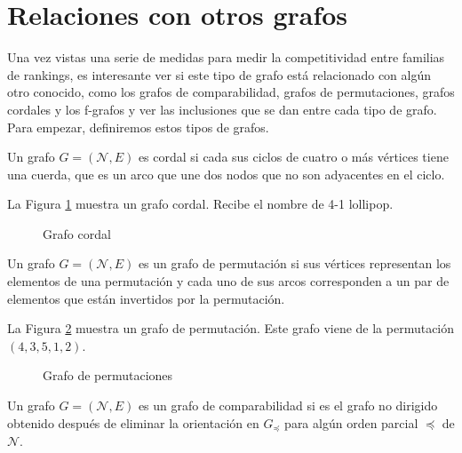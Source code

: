 \section{Relaciones con otros grafos}

Una vez vistas una serie de medidas para medir la competitividad entre familias de rankings, es interesante ver si este tipo de grafo está relacionado con algún otro conocido, como los grafos de comparabilidad, grafos de permutaciones, grafos cordales y los f-grafos y ver las inclusiones que se dan entre cada tipo de grafo. Para empezar, definiremos estos tipos de grafos.

\begin{defi}
Un grafo $G = (\mathcal{N}, E)$ es cordal si cada sus ciclos de cuatro o más vértices tiene una cuerda, que es un arco que une dos nodos que no son adyacentes en el ciclo.
\end{defi} 

\begin{ejemplo}
La Figura \ref{fig:grafo_cordal} muestra un grafo cordal. Recibe el nombre de 4-1 lollipop.

\begin{figure}[htb]
\centering
\ejemplografocordal
\caption{Grafo cordal}
\label{fig:grafo_cordal}
\end{figure}
\end{ejemplo}

\begin{defi}
Un grafo $G = (\mathcal{N}, E)$ es un grafo de permutación si sus vértices representan los elementos de una permutación y cada uno de sus arcos corresponden a un par de elementos que están invertidos por la permutación.
\end{defi}

\begin{ejemplo}
La Figura \ref{fig:grafo_permutación} muestra un grafo de permutación. Este grafo viene de la permutación $(4,3,5,1,2)$.  

\begin{figure}[htb]
\centering
\ejemplografopermutacion
\caption{Grafo de permutaciones}
\label{fig:grafo_permutación}
\end{figure}
\end{ejemplo}

\begin{defi}
Un grafo $G = (\mathcal{N}, E)$ es un grafo de comparabilidad si es el grafo no dirigido obtenido después de eliminar la orientación en $G_\preceq$ para algún orden parcial $\preceq$ de $\mathcal{N}$.  
\end{defi}

